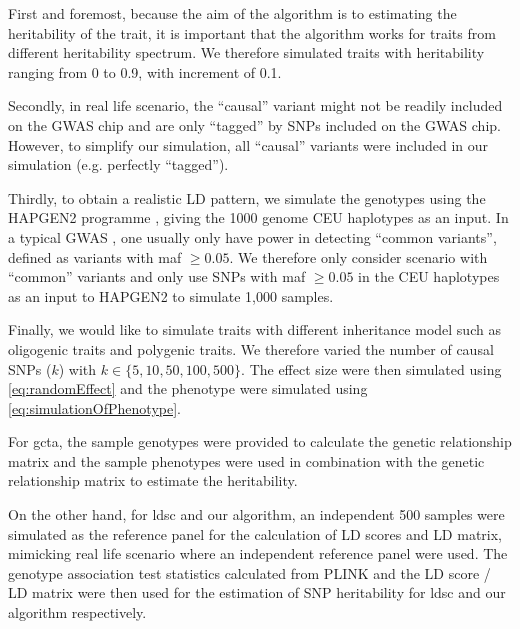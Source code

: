 \documentclass[12pt]{scrbook}
\begin{document}
First and foremost, because the aim of the algorithm is to estimating the heritability of the trait, it is important that the algorithm works for traits from different heritability spectrum.
We therefore simulated traits with heritability ranging from 0 to 0.9, with increment of 0.1.

Secondly, in real life scenario, the ``causal'' variant might not be readily included on the \gls{GWAS} chip and are only ``tagged'' by \glspl{SNP} included on the \gls{GWAS} chip.
However, to simplify our simulation, all ``causal'' variants were included in our simulation (e.g. perfectly ``tagged'').

Thirdly, to obtain a realistic \gls{LD} pattern, we simulate the genotypes using the HAPGEN2 programme \citep{Su2011}, giving the 1000 genome \gls{CEU} haplotypes as an input.
In a typical \gls{GWAS} , one usually only have power in detecting ``common variants'', defined as variants with \gls{maf} $\ge 0.05$.
We therefore only consider scenario with ``common'' variants and only use \glspl{SNP} with \gls{maf} $\ge0.05$ in the \gls{CEU} haplotypes as an input to HAPGEN2 to simulate 1,000 samples.

Finally, we would like to simulate traits with different inheritance model such as oligogenic traits and polygenic traits.
We therefore varied the number of causal \glspl{SNP} ($k$) with $k\in\{5, 10, 50, 100, 500\}$.
The effect size were then simulated using \cref{eq:randomEffect} and the phenotype were simulated using \cref{eq:simulationOfPhenotype}.

For \gls{gcta}, the sample genotypes were provided to calculate the genetic relationship matrix and the sample phenotypes were used in combination with the genetic relationship matrix to estimate the heritability.

On the other hand, for \gls{ldsc} and our algorithm, an independent 500 samples were simulated as the reference panel for the calculation of \gls{LD} scores and \gls{LD} matrix, mimicking real life scenario where an independent reference panel were used. 
The genotype association test statistics calculated from PLINK and the \gls{LD} score / \gls{LD} matrix were then used for the estimation of \gls{SNP} heritability for \gls{ldsc} and our algorithm respectively. 
\end{document}

